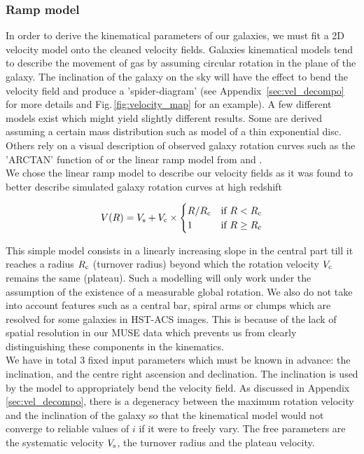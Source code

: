 \subsubsection{Ramp model}
\label{subsec:ramp_model}

In order to derive the kinematical parameters of our galaxies, we must fit a 2D velocity model onto the cleaned velocity fields. Galaxies kinematical models tend to describe the movement of gas by assuming circular rotation in the plane of the galaxy. The inclination of the galaxy on the sky will have the effect to bend the velocity field and produce a 'spider-diagram' (see Appendix \,\ref{sec:vel_decompo} for more details and Fig.\,\ref{fig:velocity_map} for an example). A few different models exist which might yield slightly different results. Some are derived assuming a certain mass distribution such as  model of a thin exponential disc. Others rely on a visual description of observed galaxy rotation curves such as the 'ARCTAN' function of  or the linear ramp model from  and .\\


We chose the linear ramp model to describe our velocity fields as it was found to better describe simulated galaxy rotation curves at high redshift

\begin{equation}
	V(R) = V_{\rm{s}} + V_{\rm{c}}  \times
	\begin{cases}
 		R / R_{\rm{c}} &\mbox{if } R < R_{\rm{c}} \\
		1 &\mbox{if }  R \geq R_{\rm{c}}
	\end{cases}
\end{equation}

This simple model consists in a linearly increasing slope in the central part till it reaches a radius $R_{\rm{c}}$ (turnover radius) beyond which the rotation velocity $V_{\rm{c}}$ remains the same (plateau). Such a modelling will only work under the assumption of the existence of a measurable global rotation. We also do not take into account features such as a central bar, spiral arms or clumps which are resolved for some galaxies in HST-ACS images. This is because of the lack of spatial resolution in our MUSE data which prevents us from clearly distinguishing these components in the kinematics. \\

We have in total $3$ fixed input parameters which must be known in advance: the inclination, and the centre right ascension and declination. The inclination is used by the model to appropriately bend the velocity field. As discussed in Appendix \ref{sec:vel_decompo}, there is a degeneracy between the maximum rotation velocity and the inclination of the galaxy so that the kinematical model would not converge to reliable values of $i$ if it were to freely vary. The free parameters are the systematic velocity $V_{\rm{s}}$, the turnover radius and the plateau velocity. 


